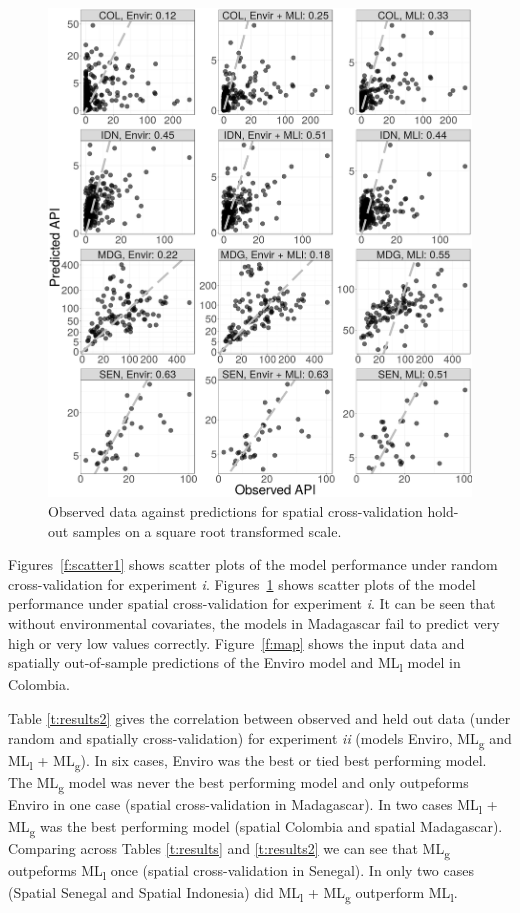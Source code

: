 \documentclass[review]{elsarticle}
\begin{document}
\begin{figure}
  \includegraphics[width=\textwidth]{figs/cv2_l_scatter.png}
\caption{
  Observed data against predictions for spatial cross-validation hold-out samples on a square root transformed scale.
}
\label{f:scatter2}
\end{figure}

Figures~\ref{f:scatter1} shows scatter plots of the model performance under random cross-validation for experiment \emph{i}.
Figures~\ref{f:scatter2} shows scatter plots of the model performance under spatial cross-validation for experiment \emph{i}.
It can be seen that without environmental covariates, the models in Madagascar fail to predict very high or very low values correctly.
Figure~\ref{f:map} shows the input data and spatially out-of-sample predictions of the Enviro model and ML\textsubscript{l} model in Colombia.



Table \ref{t:results2} gives the correlation between observed and held out data (under random and spatially cross-validation) for experiment \emph{ii} (models Enviro, ML\textsubscript{g} and ML\textsubscript{l} + ML\textsubscript{g}).
In six cases, Enviro was the best or tied best performing model.
The ML\textsubscript{g} model was never the best performing model and only outpeforms Enviro in one case (spatial cross-validation in Madagascar).
In two cases ML\textsubscript{l} + ML\textsubscript{g} was the best performing model (spatial Colombia and spatial Madagascar).
Comparing across Tables \ref{t:results} and \ref{t:results2} we can see that ML\textsubscript{g} outpeforms ML\textsubscript{l} once (spatial cross-validation in Senegal).
In only two cases (Spatial Senegal and Spatial Indonesia) did ML\textsubscript{l} + ML\textsubscript{g} outperform ML\textsubscript{l}.
\end{document}

